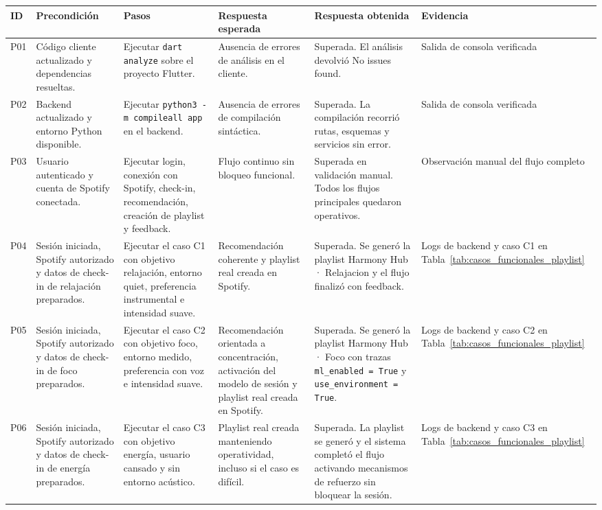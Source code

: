 \begin{table}[H]
\centering
\scriptsize
\renewcommand{\arraystretch}{1.1}
\setlength{\tabcolsep}{3pt}
\begin{tabularx}{\textwidth}{|P{0.9cm}|P{2.2cm}|Y|P{2.4cm}|P{2.8cm}|P{1.9cm}|}
\hline
\textbf{ID} & \textbf{Precondición} & \textbf{Pasos} & \textbf{Respuesta esperada} & \textbf{Respuesta obtenida} & \textbf{Evidencia} \\
\hline
P01 & Código cliente actualizado y dependencias resueltas. & Ejecutar \texttt{dart analyze} sobre el proyecto Flutter. & Ausencia de errores de análisis en el cliente. & Superada. El análisis devolvió No issues found. & Salida de consola verificada \\
\hline
P02 & Backend actualizado y entorno Python disponible. & Ejecutar \texttt{python3 -m compileall app} en el backend. & Ausencia de errores de compilación sintáctica. & Superada. La compilación recorrió rutas, esquemas y servicios sin error. & Salida de consola verificada \\
\hline
P03 & Usuario autenticado y cuenta de Spotify conectada. & Ejecutar login, conexión con Spotify, check-in, recomendación, creación de playlist y feedback. & Flujo continuo sin bloqueo funcional. & Superada en validación manual. Todos los flujos principales quedaron operativos. & Observación manual del flujo completo \\
\hline
P04 & Sesión iniciada, Spotify autorizado y datos de check-in de relajación preparados. & Ejecutar el caso C1 con objetivo relajación, entorno quiet, preferencia instrumental e intensidad suave. & Recomendación coherente y playlist real creada en Spotify. & Superada. Se generó la playlist Harmony Hub · Relajacion y el flujo finalizó con feedback. & Logs de backend y caso C1 en Tabla~\ref{tab:casos_funcionales_playlist} \\
\hline
P05 & Sesión iniciada, Spotify autorizado y datos de check-in de foco preparados. & Ejecutar el caso C2 con objetivo foco, entorno medido, preferencia con voz e intensidad suave. & Recomendación orientada a concentración, activación del modelo de sesión y playlist real creada en Spotify. & Superada. Se generó la playlist Harmony Hub · Foco con trazas \texttt{ml\_enabled = True} y \texttt{use\_environment = True}. & Logs de backend y caso C2 en Tabla~\ref{tab:casos_funcionales_playlist} \\
\hline
P06 & Sesión iniciada, Spotify autorizado y datos de check-in de energía preparados. & Ejecutar el caso C3 con objetivo energía, usuario cansado y sin entorno acústico. & Playlist real creada manteniendo operatividad, incluso si el caso es difícil. & Superada. La playlist se generó y el sistema completó el flujo activando mecanismos de refuerzo sin bloquear la sesión. & Logs de backend y caso C3 en Tabla~\ref{tab:casos_funcionales_playlist} \\

\end{tabularx}
\end{table}
